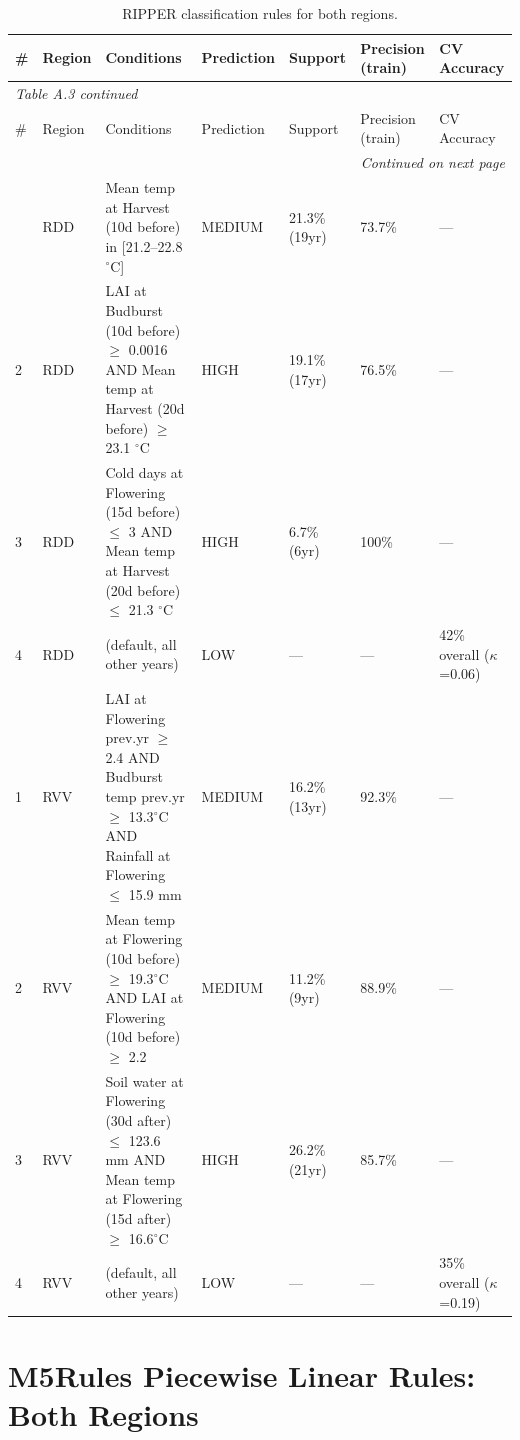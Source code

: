 {\footnotesize
\begin{longtable}{p{0.4cm}|p{1.0cm}|p{4.2cm}|p{1.5cm}|p{1.4cm}|p{1.4cm}|p{3.5cm}}
  \caption{RIPPER classification rules for both regions.}\label{tab:appa_3}\\
  \toprule
  \# & Region & Conditions & Prediction & Support & Precision (train) & CV Accuracy \\
  \midrule
  \endfirsthead
  \multicolumn{7}{l}{\small\textit{Table A.3 continued}}\\
  \toprule
  \# & Region & Conditions & Prediction & Support & Precision (train) & CV Accuracy \\
  \midrule
  \endhead
  \midrule
  \multicolumn{7}{r}{\small\textit{Continued on next page}}\\
  \endfoot
  \bottomrule
  \endlastfoot
  1 & RDD & Mean temp at Harvest (10d before) in [21.2--22.8 $^\circ$C] & MEDIUM & 21.3\% (19yr) & 73.7\% & --- \\
  2 & RDD & LAI at Budburst (10d before) $\geq$ 0.0016
AND Mean temp at Harvest (20d before) $\geq$ 23.1 $^\circ$C & HIGH & 19.1\% (17yr) & 76.5\% & --- \\
  3 & RDD & Cold days at Flowering (15d before) $\leq$ 3
AND Mean temp at Harvest (20d before) $\leq$ 21.3 $^\circ$C & HIGH & 6.7\% (6yr) & 100\% & --- \\
  4 & RDD & (default, all other years) & LOW & --- & --- & 42\% overall ($\kappa$=0.06) \\
  1 & RVV & LAI at Flowering prev.yr $\geq$ 2.4
AND Budburst temp prev.yr $\geq$ 13.3$^\circ$C
AND Rainfall at Flowering $\leq$ 15.9 mm & MEDIUM & 16.2\% (13yr) & 92.3\% & --- \\
  2 & RVV & Mean temp at Flowering (10d before) $\geq$ 19.3$^\circ$C
AND LAI at Flowering (10d before) $\geq$ 2.2 & MEDIUM & 11.2\% (9yr) & 88.9\% & --- \\
  3 & RVV & Soil water at Flowering (30d after) $\leq$ 123.6 mm
AND Mean temp at Flowering (15d after) $\geq$ 16.6$^\circ$C & HIGH & 26.2\% (21yr) & 85.7\% & --- \\
  4 & RVV & (default, all other years) & LOW & --- & --- & 35\% overall ($\kappa$=0.19) \\
\end{longtable}
}



\section{M5Rules Piecewise Linear Rules: Both Regions}\label{app_sec:m5rules_piecewise_linear_rules}

